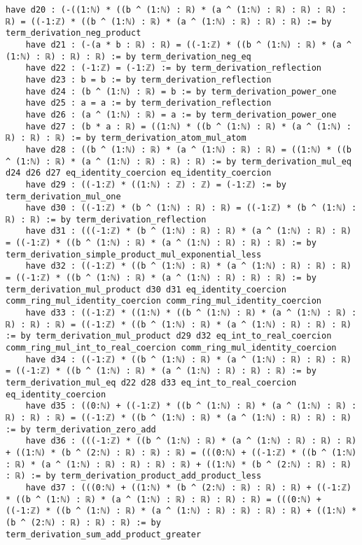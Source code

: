 \documentclass{article}
\begin{document}
\begin{tcolorbox}[colback=white!10, width=\linewidth]
\begin{lstlisting}[language=Lean4]
    have d20 : (-((1:ℕ) * ((b ^ (1:ℕ) : ℝ) * (a ^ (1:ℕ) : ℝ) : ℝ) : ℝ) : ℝ) = ((-1:ℤ) * ((b ^ (1:ℕ) : ℝ) * (a ^ (1:ℕ) : ℝ) : ℝ) : ℝ) := by term_derivation_neg_product
    have d21 : (-(a * b : ℝ) : ℝ) = ((-1:ℤ) * ((b ^ (1:ℕ) : ℝ) * (a ^ (1:ℕ) : ℝ) : ℝ) : ℝ) := by term_derivation_neg_eq
    have d22 : (-1:ℤ) = (-1:ℤ) := by term_derivation_reflection
    have d23 : b = b := by term_derivation_reflection
    have d24 : (b ^ (1:ℕ) : ℝ) = b := by term_derivation_power_one
    have d25 : a = a := by term_derivation_reflection
    have d26 : (a ^ (1:ℕ) : ℝ) = a := by term_derivation_power_one
    have d27 : (b * a : ℝ) = ((1:ℕ) * ((b ^ (1:ℕ) : ℝ) * (a ^ (1:ℕ) : ℝ) : ℝ) : ℝ) := by term_derivation_atom_mul_atom
    have d28 : ((b ^ (1:ℕ) : ℝ) * (a ^ (1:ℕ) : ℝ) : ℝ) = ((1:ℕ) * ((b ^ (1:ℕ) : ℝ) * (a ^ (1:ℕ) : ℝ) : ℝ) : ℝ) := by term_derivation_mul_eq d24 d26 d27 eq_identity_coercion eq_identity_coercion
    have d29 : ((-1:ℤ) * ((1:ℕ) : ℤ) : ℤ) = (-1:ℤ) := by term_derivation_mul_one
    have d30 : ((-1:ℤ) * (b ^ (1:ℕ) : ℝ) : ℝ) = ((-1:ℤ) * (b ^ (1:ℕ) : ℝ) : ℝ) := by term_derivation_reflection
    have d31 : (((-1:ℤ) * (b ^ (1:ℕ) : ℝ) : ℝ) * (a ^ (1:ℕ) : ℝ) : ℝ) = ((-1:ℤ) * ((b ^ (1:ℕ) : ℝ) * (a ^ (1:ℕ) : ℝ) : ℝ) : ℝ) := by term_derivation_simple_product_mul_exponential_less
    have d32 : ((-1:ℤ) * ((b ^ (1:ℕ) : ℝ) * (a ^ (1:ℕ) : ℝ) : ℝ) : ℝ) = ((-1:ℤ) * ((b ^ (1:ℕ) : ℝ) * (a ^ (1:ℕ) : ℝ) : ℝ) : ℝ) := by term_derivation_mul_product d30 d31 eq_identity_coercion comm_ring_mul_identity_coercion comm_ring_mul_identity_coercion
    have d33 : ((-1:ℤ) * ((1:ℕ) * ((b ^ (1:ℕ) : ℝ) * (a ^ (1:ℕ) : ℝ) : ℝ) : ℝ) : ℝ) = ((-1:ℤ) * ((b ^ (1:ℕ) : ℝ) * (a ^ (1:ℕ) : ℝ) : ℝ) : ℝ) := by term_derivation_mul_product d29 d32 eq_int_to_real_coercion comm_ring_mul_int_to_real_coercion comm_ring_mul_identity_coercion
    have d34 : ((-1:ℤ) * ((b ^ (1:ℕ) : ℝ) * (a ^ (1:ℕ) : ℝ) : ℝ) : ℝ) = ((-1:ℤ) * ((b ^ (1:ℕ) : ℝ) * (a ^ (1:ℕ) : ℝ) : ℝ) : ℝ) := by term_derivation_mul_eq d22 d28 d33 eq_int_to_real_coercion eq_identity_coercion
    have d35 : ((0:ℕ) + ((-1:ℤ) * ((b ^ (1:ℕ) : ℝ) * (a ^ (1:ℕ) : ℝ) : ℝ) : ℝ) : ℝ) = ((-1:ℤ) * ((b ^ (1:ℕ) : ℝ) * (a ^ (1:ℕ) : ℝ) : ℝ) : ℝ) := by term_derivation_zero_add
    have d36 : (((-1:ℤ) * ((b ^ (1:ℕ) : ℝ) * (a ^ (1:ℕ) : ℝ) : ℝ) : ℝ) + ((1:ℕ) * (b ^ (2:ℕ) : ℝ) : ℝ) : ℝ) = (((0:ℕ) + ((-1:ℤ) * ((b ^ (1:ℕ) : ℝ) * (a ^ (1:ℕ) : ℝ) : ℝ) : ℝ) : ℝ) + ((1:ℕ) * (b ^ (2:ℕ) : ℝ) : ℝ) : ℝ) := by term_derivation_product_add_product_less
    have d37 : (((0:ℕ) + ((1:ℕ) * (b ^ (2:ℕ) : ℝ) : ℝ) : ℝ) + ((-1:ℤ) * ((b ^ (1:ℕ) : ℝ) * (a ^ (1:ℕ) : ℝ) : ℝ) : ℝ) : ℝ) = (((0:ℕ) + ((-1:ℤ) * ((b ^ (1:ℕ) : ℝ) * (a ^ (1:ℕ) : ℝ) : ℝ) : ℝ) : ℝ) + ((1:ℕ) * (b ^ (2:ℕ) : ℝ) : ℝ) : ℝ) := by term_derivation_sum_add_product_greater

\end{lstlisting}
\end{tcolorbox}
\end{document}
